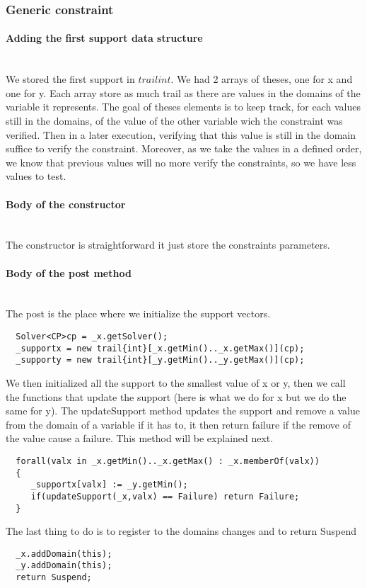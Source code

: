 \documentclass{eplDoc}
\begin{document}
\subsubsection{Generic constraint}

\paragraph{Adding the first support data structure}
 \  \\ 
We stored the first support in $trail{int}$.  We had 2 arrays of theses, one for x and one for y.  Each array store as much trail as there are values in the domains of the variable it represents.  The goal of theses elements is to keep track, for each values still in the domains, of the value of the other variable wich the constraint was verified.  Then in a later execution, verifying that this value is still in the domain suffice to verify the constraint.
Moreover, as we take the values in a defined order, we know that previous values will no more verify the constraints, so we have less values to test. 
\paragraph{Body of the constructor}
 \  \\ 
The constructor is straightforward it just store the constraints parameters.

\paragraph{Body of the post method}
 \  \\ 
The post is the place where we initialize the support vectors.
\begin{lstlisting}
  Solver<CP>cp = _x.getSolver();
  _supportx = new trail{int}[_x.getMin().._x.getMax()](cp);
  _supporty = new trail{int}[_y.getMin().._y.getMax()](cp);
\end{lstlisting}
We then initialized all the support to the smallest value of x or y, then we call the functions that update the support (here is what we do for x but we do the same for y). The updateSupport method updates the support and remove a value from the domain of a variable if it has to, it then return failure if the remove of the value cause a failure.  This method will be explained next.
\begin{lstlisting}
  forall(valx in _x.getMin().._x.getMax() : _x.memberOf(valx))
  {
     _supportx[valx] := _y.getMin();
     if(updateSupport(_x,valx) == Failure) return Failure;
  }
\end{lstlisting}
The last thing to do is to register to the domains changes and to return Suspend
\begin{lstlisting}
  _x.addDomain(this);
  _y.addDomain(this);
  return Suspend;
\end{lstlisting}
\end{document}
